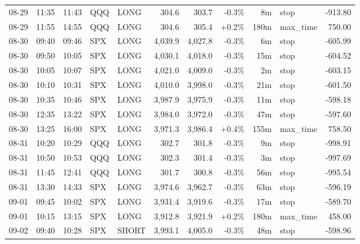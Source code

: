 \documentclass[11pt,a4paper,twoside]{article}
\begin{document}
\begin{center}
\begin{longtable}{>{\color{txtmain}}l l l l l r r r r >{\color{txtmain}}l r}
08-29 & 11:35 & 11:43 & QQQ & LONG & 304.6 & 303.7 & \textcolor{lossred}{-0.3\%} & 8m & stop & \textcolor{lossred}{-913.80} \\
08-29 & 11:55 & 14:55 & QQQ & LONG & 304.6 & 305.4 & \textcolor{wingreen}{+0.2\%} & 180m & max\_time & \textcolor{wingreen}{750.00} \\
08-30 & 09:40 & 09:46 & SPX & LONG & 4,039.9 & 4,027.8 & \textcolor{lossred}{-0.3\%} & 6m & stop & \textcolor{lossred}{-605.99} \\
08-30 & 09:50 & 10:05 & SPX & LONG & 4,030.1 & 4,018.0 & \textcolor{lossred}{-0.3\%} & 15m & stop & \textcolor{lossred}{-604.52} \\
08-30 & 10:05 & 10:07 & SPX & LONG & 4,021.0 & 4,009.0 & \textcolor{lossred}{-0.3\%} & 2m & stop & \textcolor{lossred}{-603.15} \\
08-30 & 10:10 & 10:31 & SPX & LONG & 4,010.0 & 3,998.0 & \textcolor{lossred}{-0.3\%} & 21m & stop & \textcolor{lossred}{-601.50} \\
08-30 & 10:35 & 10:46 & SPX & LONG & 3,987.9 & 3,975.9 & \textcolor{lossred}{-0.3\%} & 11m & stop & \textcolor{lossred}{-598.18} \\
08-30 & 12:35 & 13:22 & SPX & LONG & 3,984.0 & 3,972.0 & \textcolor{lossred}{-0.3\%} & 47m & stop & \textcolor{lossred}{-597.60} \\
08-30 & 13:25 & 16:00 & SPX & LONG & 3,971.3 & 3,986.4 & \textcolor{wingreen}{+0.4\%} & 155m & max\_time & \textcolor{wingreen}{758.50} \\
08-31 & 10:20 & 10:29 & QQQ & LONG & 302.7 & 301.8 & \textcolor{lossred}{-0.3\%} & 9m & stop & \textcolor{lossred}{-998.91} \\
08-31 & 10:50 & 10:53 & QQQ & LONG & 302.3 & 301.4 & \textcolor{lossred}{-0.3\%} & 3m & stop & \textcolor{lossred}{-997.69} \\
08-31 & 11:45 & 12:41 & QQQ & LONG & 301.7 & 300.8 & \textcolor{lossred}{-0.3\%} & 56m & stop & \textcolor{lossred}{-995.54} \\
08-31 & 13:30 & 14:33 & SPX & LONG & 3,974.6 & 3,962.7 & \textcolor{lossred}{-0.3\%} & 63m & stop & \textcolor{lossred}{-596.19} \\
09-01 & 09:45 & 10:02 & SPX & LONG & 3,931.4 & 3,919.6 & \textcolor{lossred}{-0.3\%} & 17m & stop & \textcolor{lossred}{-589.70} \\
09-01 & 10:15 & 13:15 & SPX & LONG & 3,912.8 & 3,921.9 & \textcolor{wingreen}{+0.2\%} & 180m & max\_time & \textcolor{wingreen}{458.00} \\
09-02 & 09:40 & 10:28 & SPX & SHORT & 3,993.1 & 4,005.0 & \textcolor{lossred}{-0.3\%} & 48m & stop & \textcolor{lossred}{-598.96} \\

\end{longtable}
\end{center}
\end{document}
